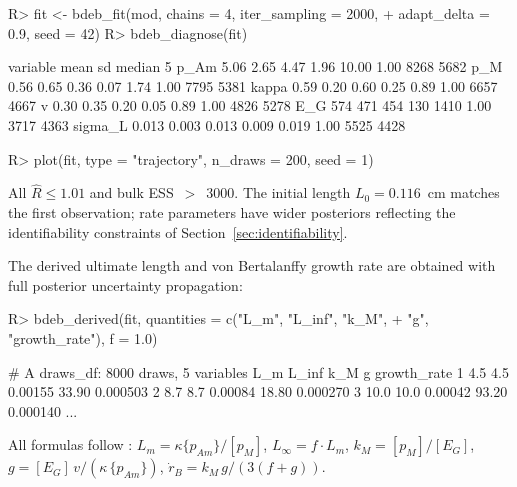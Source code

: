 \documentclass[article,shortnames]{jss}
\newcommand{\pAm}{\{p_{Am}\}}
\newcommand{\pM}{[p_M]}
\newcommand{\EG}{[E_G]}
\begin{document}
\begin{CodeChunk}
\begin{CodeInput}
R> fit <- bdeb_fit(mod, chains = 4, iter_sampling = 2000,
+    adapt_delta = 0.9, seed = 42)
R> bdeb_diagnose(fit)
\end{CodeInput}
\begin{CodeOutput}
  variable  mean    sd median    5%
      p_Am  5.06  2.65   4.47  1.96 10.00 1.00     8268     5682
       p_M  0.56  0.65   0.36  0.07  1.74 1.00     7795     5381
     kappa  0.59  0.20   0.60  0.25  0.89 1.00     6657     4667
         v  0.30  0.35   0.20  0.05  0.89 1.00     4826     5278
       E_G   574   471    454   130  1410  1.00     3717     4363
   sigma_L 0.013 0.003  0.013 0.009 0.019 1.00     5525     4428
\end{CodeOutput}
\begin{CodeInput}
R> plot(fit, type = "trajectory", n_draws = 200, seed = 1)
\end{CodeInput}
\end{CodeChunk}
\noindent
All $\hat{R} \leq 1.01$ and bulk ESS~$>$~3000.  The initial
length $L_0 = 0.116$~cm matches the first observation; rate
parameters have wider posteriors reflecting the identifiability
constraints of Section~\ref{sec:identifiability}.

The derived ultimate length and von Bertalanffy growth rate are
obtained with full posterior uncertainty propagation:
\begin{CodeChunk}
\begin{CodeInput}
R> bdeb_derived(fit, quantities = c("L_m", "L_inf", "k_M",
+    "g", "growth_rate"), f = 1.0)
\end{CodeInput}
\begin{CodeOutput}
# A draws_df: 8000 draws, 5 variables
     L_m L_inf     k_M      g growth_rate
1    4.5   4.5 0.00155  33.90    0.000503
2    8.7   8.7 0.00084  18.80    0.000270
3   10.0  10.0 0.00042  93.20    0.000140
...
\end{CodeOutput}
\end{CodeChunk}
All formulas follow \citet[Table~3.1]{Kooijman2010}: $L_m = \kappa
\pAm / \pM$, $L_\infty = f \cdot L_m$, $k_M = \pM / \EG$,
$g = \EG \, v / (\kappa \, \pAm)$, $\dot{r}_B = k_M \, g / (3(f + g))$.
\end{document}
